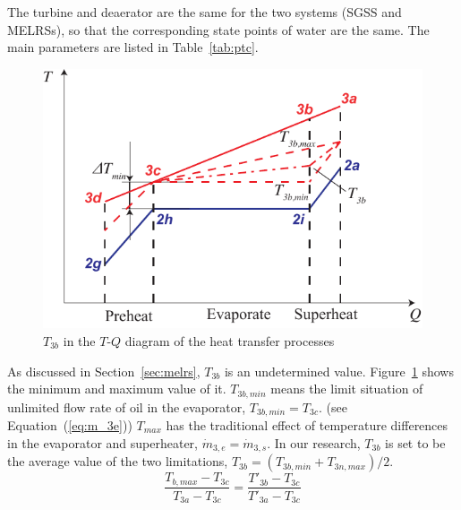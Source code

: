 The turbine and deaerator are the same for the two systems (SGSS and MELRSs), so that the corresponding state points of water are the same. The main parameters are listed in Table~\ref{tab:ptc}.

\noindent \begin{figure}[htbp]
\begin{center}
	\includegraphics[width = 0.7\columnwidth]{fig/T3b}
	\caption{$T_{3b}$ in the $T$-$Q$ diagram of the heat transfer processes}
	\label{fig:T3b}
\end{center}
\end{figure}

As discussed in Section~\ref{sec:melrs}, $T_{3b}$ is an undetermined value. Figure~\ref{fig:T3b} shows the minimum and maximum value of it. $T_{3b,min}$ means the limit situation of unlimited flow rate of oil in the evaporator, $T_{3b,min} = T_{3c}$. (see Equation~(\ref{eq:m_3e})) $T_{max}$ has the traditional effect of temperature differences in the evaporator and superheater, $\dot{m}_{3,e} = \dot{m}_{3,s}$. In our research, $T_{3b}$ is set to be the average value of the two limitations, $T_{3b} = (T_{3b,min} + T_{3n,max}) / 2$.
\begin{equation}
  \dfrac{T_{b,max}-T_{3c}}{T_{3a} - T_{3c}} = \dfrac{T'_{3b} - T_{3c}}{T'_{3a} - T_{3c}}
\end{equation}

